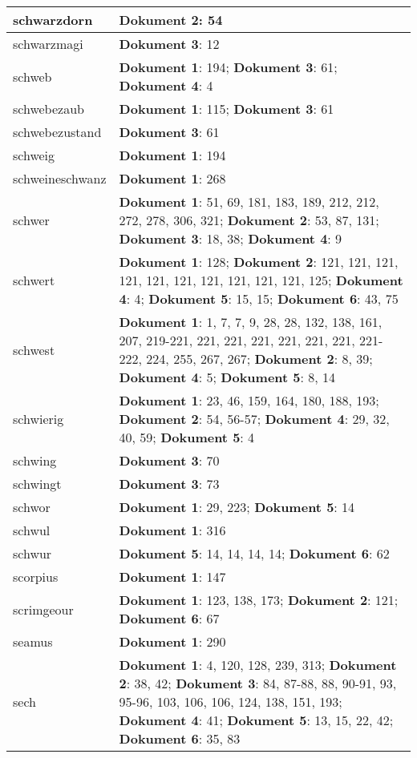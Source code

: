 \documentclass[a5paper]{article}
\begin{document}
\begin{longtable}[l]{|l|p{3in}|}
\hline
schwarzdorn & \textbf{Dokument 2}: 54 \\
\hline
schwarzmagi & \textbf{Dokument 3}: 12 \\
\hline
schweb & \textbf{Dokument 1}: 194; \textbf{Dokument 3}: 61; \textbf{Dokument 4}: 4 \\
\hline
schwebezaub & \textbf{Dokument 1}: 115; \textbf{Dokument 3}: 61 \\
\hline
schwebezustand & \textbf{Dokument 3}: 61 \\
\hline
schweig & \textbf{Dokument 1}: 194 \\
\hline
schweineschwanz & \textbf{Dokument 1}: 268 \\
\hline
schwer & \textbf{Dokument 1}: 51, 69, 181, 183, 189, 212, 212, 272, 278, 306, 321; \textbf{Dokument 2}: 53, 87, 131; \textbf{Dokument 3}: 18, 38; \textbf{Dokument 4}: 9 \\
\hline
schwert & \textbf{Dokument 1}: 128; \textbf{Dokument 2}: 121, 121, 121, 121, 121, 121, 121, 121, 121, 121, 125; \textbf{Dokument 4}: 4; \textbf{Dokument 5}: 15, 15; \textbf{Dokument 6}: 43, 75 \\
\hline
schwest & \textbf{Dokument 1}: 1, 7, 7, 9, 28, 28, 132, 138, 161, 207, 219-221, 221, 221, 221, 221, 221, 221, 221-222, 224, 255, 267, 267; \textbf{Dokument 2}: 8, 39; \textbf{Dokument 4}: 5; \textbf{Dokument 5}: 8, 14 \\
\hline
schwierig & \textbf{Dokument 1}: 23, 46, 159, 164, 180, 188, 193; \textbf{Dokument 2}: 54, 56-57; \textbf{Dokument 4}: 29, 32, 40, 59; \textbf{Dokument 5}: 4 \\
\hline
schwing & \textbf{Dokument 3}: 70 \\
\hline
schwingt & \textbf{Dokument 3}: 73 \\
\hline
schwor & \textbf{Dokument 1}: 29, 223; \textbf{Dokument 5}: 14 \\
\hline
schwul & \textbf{Dokument 1}: 316 \\
\hline
schwur & \textbf{Dokument 5}: 14, 14, 14, 14; \textbf{Dokument 6}: 62 \\
\hline
scorpius & \textbf{Dokument 1}: 147 \\
\hline
scrimgeour & \textbf{Dokument 1}: 123, 138, 173; \textbf{Dokument 2}: 121; \textbf{Dokument 6}: 67 \\
\hline
seamus & \textbf{Dokument 1}: 290 \\
\hline
sech & \textbf{Dokument 1}: 4, 120, 128, 239, 313; \textbf{Dokument 2}: 38, 42; \textbf{Dokument 3}: 84, 87-88, 88, 90-91, 93, 95-96, 103, 106, 106, 124, 138, 151, 193; \textbf{Dokument 4}: 41; \textbf{Dokument 5}: 13, 15, 22, 42; \textbf{Dokument 6}: 35, 83 \\

\end{longtable}
\end{document}
